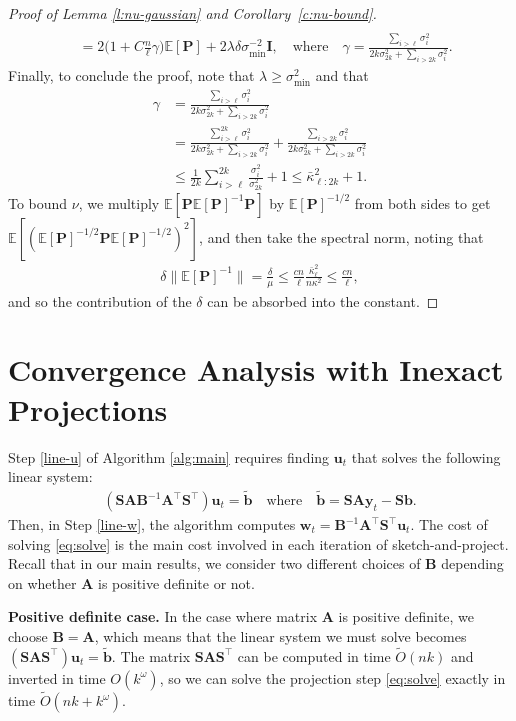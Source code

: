 \documentclass[11pt]{article}
\let\origtop\top
\renewcommand\top{{\scriptscriptstyle{\origtop}}}
\def\w{{\mathbf w}}
\def\u{{\mathbf u}}
\def\y{{\mathbf y}}
\def\b{{\mathbf b}}
\def\A{{\mathbf A}}
\def\B{{\mathbf B}}
\def\I{{\mathbf I}}
\def\S{{\mathbf S}}
\def\P{{\mathbf P}}
\def\E{{\mathds E}}
\begin{document}
\begin{proof}[Proof of Lemma \ref{l:nu-gaussian} and Corollary~\ref{c:nu-bound}]
\begin{align*}
\\
&= 2\Big(1 + C\frac n\ell \gamma\Big)\E[\P] + 2\lambda\delta\sigma_{\min}^{-2}\I,\quad\text{where}\quad
\gamma = \frac{\sum_{i>\ell}\sigma_i^2}{2k\sigma_{2k}^2+\sum_{i>2k}\sigma_i^2}.
\end{align*} 
Finally, to conclude the proof, note that $\lambda \geq \sigma_{\min}^2$ and that
\begin{align*}
    \gamma 
    &= \frac{\sum_{i>\ell}\sigma_i^2}{2k\sigma_{2k}^2+\sum_{i>2k}\sigma_i^2} \\
    &= \frac{\sum_{i>\ell}^{2k}\sigma_i^2}{2k\sigma_{2k}^2+\sum_{i>2k}\sigma_i^2} + \frac{\sum_{i>2k}\sigma_i^2}{2k\sigma_{2k}^2+\sum_{i>2k}\sigma_i^2}
    \\
    &\leq \frac1{2k}\sum_{i>\ell}^{2k}\frac{\sigma_i^2}{\sigma_{2k}^2} + 1 \leq \bar\kappa_{\ell:2k}^2+1.
\end{align*}
To bound $\nu$, we multiply $\E[\P\E[\P]^{-1}\P]$ by $\E[\P]^{-1/2}$ from both sides to get $\E[(\E[\P]^{-1/2}\P\E[\P]^{-1/2})^2]$, 
and then take the spectral norm, noting that 
\begin{align*}
    \delta \|\E[\P]^{-1}\| = \frac{\delta}{\mu} \leq 
    \frac{c n}{\ell} \frac{\bar\kappa_{\ell}^2}{n \kappa^2} \leq \frac{cn}{\ell},
\end{align*}
and so the contribution of the $\delta$ can be absorbed into the constant.
\end{proof}


\section{Convergence Analysis with Inexact Projections}\label{s:inexact}
Step \ref{line-u} of Algorithm \ref{alg:main} requires finding $\u_t$ that solves the following linear system:
\begin{align}
(\S\A\B^{-1}\A^\top\S^\top) \u_t = \tilde\b\quad\text{where}\quad\tilde\b=\S\A\y_t-\S\b.\label{eq:solve}
\end{align}
Then, in Step \ref{line-w}, the algorithm computes $\w_t=\B^{-1}\A^\top\S^\top\u_t$. The cost of solving \eqref{eq:solve} is the main cost involved in each iteration of sketch-and-project. Recall that in our main results, we consider two different choices of $\B$ depending on whether $\A$ is positive definite or not.
\smallskip

\noindent
\textbf{Positive definite case.} In the case where matrix $\A$ is positive definite, we choose $\B=\A$, which means that the linear system we must solve becomes $(\S\A\S^\top)\u_t = \tilde\b$. The matrix $\S\A\S^\top$ can be computed in time $\tilde O(nk)$ and inverted in time $O(k^\omega)$, so we can solve the projection step \eqref{eq:solve} exactly in time $\tilde O(nk + k^\omega)$.
\smallskip
\end{document}
